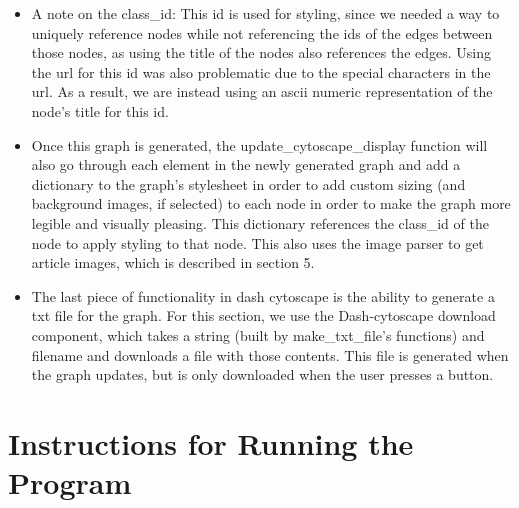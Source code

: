 \documentclass[fontsize=11pt]{article}
\begin{document}
\begin{enumerate}
\begin{itemize}
        \item A note on the class\_id: This id is used for styling, since we needed a way to uniquely reference nodes while not referencing the ids of the edges between those nodes, as using the title of the nodes also references the edges. Using the url for this id was also problematic due to the special characters in the url. As a result, we are instead using an ascii numeric representation of the node's title for this id.
        \item Once this graph is generated, the update\_cytoscape\_display function will also go through each element in the newly generated graph and add a dictionary to the graph's stylesheet in order to add custom sizing (and background images, if selected) to each node in order to make the graph more legible and visually pleasing. This dictionary references the class\_id of the node to apply styling to that node. This also uses the image parser to get article images, which is described in section 5.
        \item The last piece of functionality in dash cytoscape is the ability to generate a txt file for the graph. For this section, we use the Dash-cytoscape download component, which takes a string (built by make\_txt\_file's functions) and filename and downloads a file with those contents. This file is generated when the graph updates, but is only downloaded when the user presses a button.
    \end{itemize}
\end{enumerate}


\section*{Instructions for Running the Program}
\end{document}
